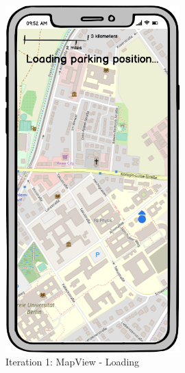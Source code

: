 \begin{figure}[H]
  \centering
  \begin{minipage}[b]{0.45\textwidth}
    \centering
    \includegraphics[width=0.6\textwidth]{images/UI/Iteration1-MapView-Loading.png}
    \caption{Iteration 1: MapView - Loading}
    \label{fig:i1-mv-loading}
  \end{minipage}
  \hfill
  \begin{minipage}[b]{0.45\textwidth}
    \centering

\end{minipage}
\end{figure}

